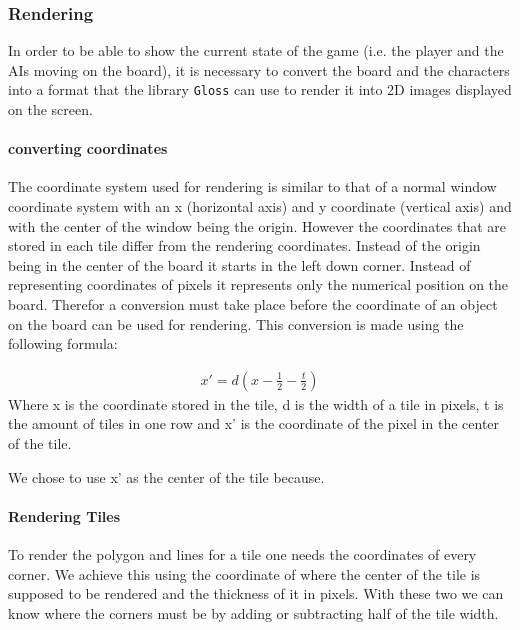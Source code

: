 \documentclass{article}
\begin{document}
    	\subsubsection{Rendering}
        In order to be able to show the current state of the game (i.e. the player and the AIs moving on the board), it is necessary to convert the board and the characters into a format that the library \texttt{Gloss} can use to render it into 2D images displayed on the screen. \\

        \paragraph{converting coordinates}

        The coordinate system used for rendering is similar to that of a normal window coordinate system with an x (horizontal axis) and y coordinate (vertical axis) and with the center of the window being the origin. However the coordinates that are stored in each tile differ from the rendering coordinates. Instead of the origin being in the center of the board it starts in the left down corner. Instead of representing coordinates of pixels it represents only the numerical position on the board. Therefor  a conversion must take place before the coordinate of an object on the board can be used for rendering.
\newline
This conversion is made using the following formula:

\begin{eqnarray}
	x' = d(x - \frac{1}{2} - \frac{t}{2})
\end{eqnarray}
	Where x is the coordinate stored in the tile, d is the width of a tile in pixels, t is the amount of tiles in one row and x' is the coordinate of the pixel in the center of the tile.

	We chose to use x' as the center of the tile because. \\
\paragraph{Rendering Tiles}
	To render the polygon and lines for a tile one needs the coordinates of every corner. We achieve this using the coordinate of where the center of the tile is supposed to be rendered and the thickness of it in pixels. With these two we can know where the corners must be by adding or subtracting half of the tile width. \\
\end{document}
